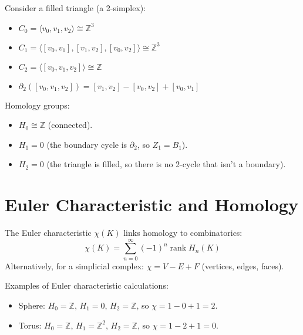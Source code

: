 \begin{example}
Consider a filled triangle (a 2-simplex):
\begin{itemize}
    \item $C_0 = \langle v_0, v_1, v_2 \rangle \cong \mathbb{Z}^3$
    \item $C_1 = \langle [v_0, v_1], [v_1, v_2], [v_0, v_2] \rangle \cong \mathbb{Z}^3$
    \item $C_2 = \langle [v_0, v_1, v_2] \rangle \cong \mathbb{Z}$
    \item $\partial_2([v_0, v_1, v_2]) = [v_1, v_2] - [v_0, v_2] + [v_0, v_1]$
\end{itemize}

Homology groups:
\begin{itemize}
    \item $H_0 \cong \mathbb{Z}$ (connected).
    \item $H_1 = 0$ (the boundary cycle is $\partial_2$, so $Z_1 = B_1$).
    \item $H_2 = 0$ (the triangle is filled, so there is no 2-cycle that isn't a boundary).
\end{itemize}
\end{example}

\section{Euler Characteristic and Homology}

\begin{definition}
The Euler characteristic $\chi(K)$ links homology to combinatorics:
\begin{equation}
\chi(K) = \sum_{n=0}^\infty (-1)^n \operatorname{rank} H_n(K)
\end{equation}
Alternatively, for a simplicial complex: $\chi = V - E + F$ (vertices, edges, faces).
\end{definition}

\begin{example}
Examples of Euler characteristic calculations:
\begin{itemize}
    \item Sphere: $H_0 = \mathbb{Z}$, $H_1 = 0$, $H_2 = \mathbb{Z}$, so $\chi = 1 - 0 + 1 = 2$.
    \item Torus: $H_0 = \mathbb{Z}$, $H_1 = \mathbb{Z}^2$, $H_2 = \mathbb{Z}$, so $\chi = 1 - 2 + 1 = 0$.
\end{itemize}
\end{example}

